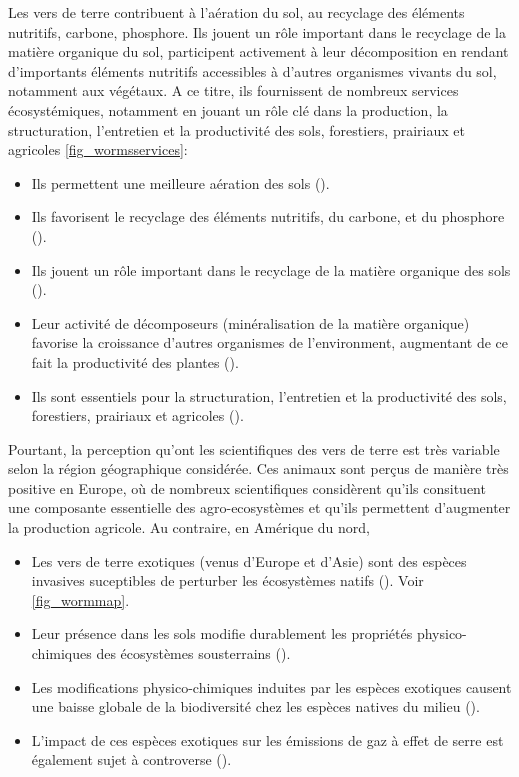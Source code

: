 \documentclass{book}
\begin{document}
\noindent
 Les vers de terre contribuent à l'aération du sol, au recyclage des éléments nutritifs, carbone, phosphore. Ils jouent un rôle important dans le recyclage de la matière organique du sol, participent activement à leur décomposition en rendant d’importants éléments nutritifs accessibles à d’autres organismes vivants du sol, notamment aux végétaux. A ce titre, ils fournissent de nombreux services écosystémiques, notamment en jouant un rôle clé dans la production, la structuration, l'entretien et la productivité des sols, forestiers, prairiaux et agricoles \cref{fig_wormsservices}\cite{11_EW_benefits_summary}:

{
\renewcommand{\labelitemi}{\textbullet}
\begin{itemize}
    \item Ils permettent une meilleure aération des sols (\cite{1_aeration_sols}).
    \item Ils favorisent le recyclage des éléments nutritifs, du carbone, et du phosphore (\cite{2_recyclage_elements_nutri}).
    \item Ils jouent un rôle important dans le recyclage de la matière organique des sols (\cite{3_recyclage_matiere_orga}).
    \item Leur activité de décomposeurs (minéralisation de la matière organique) favorise la croissance d'autres organismes de l'environment, augmentant de ce fait la productivité des plantes (\cite{4_augmentation_productivite_revue}).
    \item Ils sont essentiels pour la structuration, l’entretien et la productivité des sols, forestiers, prairiaux et agricoles (\cite{5_structuration_des_sols}).
\end{itemize}
} %
Pourtant, la perception qu'ont les scientifiques des vers de terre est très variable selon la région géographique considérée. Ces animaux sont perçus de manière très positive en Europe, où de nombreux scientifiques considèrent qu'ils consituent une composante essentielle des agro-ecosystèmes et qu'ils permettent d'augmenter la production agricole. Au contraire, en Amérique du nord,
{
\renewcommand{\labelitemi}{\textbullet}
\begin{itemize}
    \item Les vers de terre exotiques (venus d'Europe et d'Asie) sont des espèces invasives suceptibles de perturber les écosystèmes natifs (\cite{6_invasion_vers_de_terre}). Voir \cref{fig_wormmap}.
    \item Leur présence dans les sols modifie durablement les propriétés physico-chimiques des écosystèmes sousterrains (\cite{7_EW_change_soil_chemical_properties}).
    \item Les modifications physico-chimiques induites par les espèces exotiques causent une baisse globale de la biodiversité chez les espèces natives du milieu (\cite{8_EW_erode_soil_biodiversity}).
    \item L'impact de ces espèces exotiques sur les émissions de gaz à effet de serre est également sujet à controverse (\cite{9_EW_effet_serre,10_EW_pas_effet_de_serre}).
\end{itemize}
}
\end{document}
